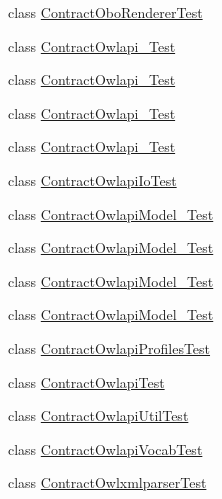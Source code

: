 \begin{DoxyCompactItemize}
class \hyperlink{classorg_1_1semanticweb_1_1owlapi_1_1contract_1_1_contract_obo_renderer_test}{Contract\-Obo\-Renderer\-Test}
\item 
class \hyperlink{classorg_1_1semanticweb_1_1owlapi_1_1contract_1_1_contract_owlapi__1_test}{Contract\-Owlapi\-\_\-Test}
\item 
class \hyperlink{classorg_1_1semanticweb_1_1owlapi_1_1contract_1_1_contract_owlapi__2_test}{Contract\-Owlapi\-\_\-Test}
\item 
class \hyperlink{classorg_1_1semanticweb_1_1owlapi_1_1contract_1_1_contract_owlapi__3_test}{Contract\-Owlapi\-\_\-Test}
\item 
class \hyperlink{classorg_1_1semanticweb_1_1owlapi_1_1contract_1_1_contract_owlapi__4_test}{Contract\-Owlapi\-\_\-Test}
\item 
class \hyperlink{classorg_1_1semanticweb_1_1owlapi_1_1contract_1_1_contract_owlapi_io_test}{Contract\-Owlapi\-Io\-Test}
\item 
class \hyperlink{classorg_1_1semanticweb_1_1owlapi_1_1contract_1_1_contract_owlapi_model__1_test}{Contract\-Owlapi\-Model\-\_\-Test}
\item 
class \hyperlink{classorg_1_1semanticweb_1_1owlapi_1_1contract_1_1_contract_owlapi_model__2_test}{Contract\-Owlapi\-Model\-\_\-Test}
\item 
class \hyperlink{classorg_1_1semanticweb_1_1owlapi_1_1contract_1_1_contract_owlapi_model__3_test}{Contract\-Owlapi\-Model\-\_\-Test}
\item 
class \hyperlink{classorg_1_1semanticweb_1_1owlapi_1_1contract_1_1_contract_owlapi_model__4_test}{Contract\-Owlapi\-Model\-\_\-Test}
\item 
class \hyperlink{classorg_1_1semanticweb_1_1owlapi_1_1contract_1_1_contract_owlapi_profiles_test}{Contract\-Owlapi\-Profiles\-Test}
\item 
class \hyperlink{classorg_1_1semanticweb_1_1owlapi_1_1contract_1_1_contract_owlapi_test}{Contract\-Owlapi\-Test}
\item 
class \hyperlink{classorg_1_1semanticweb_1_1owlapi_1_1contract_1_1_contract_owlapi_util_test}{Contract\-Owlapi\-Util\-Test}
\item 
class \hyperlink{classorg_1_1semanticweb_1_1owlapi_1_1contract_1_1_contract_owlapi_vocab_test}{Contract\-Owlapi\-Vocab\-Test}
\item 
class \hyperlink{classorg_1_1semanticweb_1_1owlapi_1_1contract_1_1_contract_owlxmlparser_test}{Contract\-Owlxmlparser\-Test}
\item 

\end{DoxyCompactItemize}
